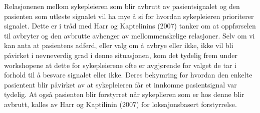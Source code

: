 \noindent
Relasjonenen mellom sykepleieren som blir avbrutt av pasientsignalet og den pasienten som utløste signalet vil ha mye å si for hvordan sykepleieren prioriterer signalet. Dette er i tråd med Harr og Kaptelinins (2007) tanker om at oppførselen til avbryter og den avbrutte avhenger av mellommenskelige relasjoner. Selv om vi kan anta at pasientens adferd, eller valg om å avbrye eller ikke, ikke vil bli påvirket i nevneverdig grad i denne situasjonen, kom det tydelig frem under workshopene at dette for sykepleierene ofte er avgjørende for valget de tar i forhold til å besvare signalet eller ikke.  
Deres bekymring for hvordan den enkelte pasientent blir påvirket av at sykepleieren får et innkomne pasientsignal var tydelig. At også pasienten blir forstyrret når sykeplieren som er hos denne blir avbrutt, kalles av Harr og Kaptilinin (2007) for loksajonsbasert forstyrrelse. 